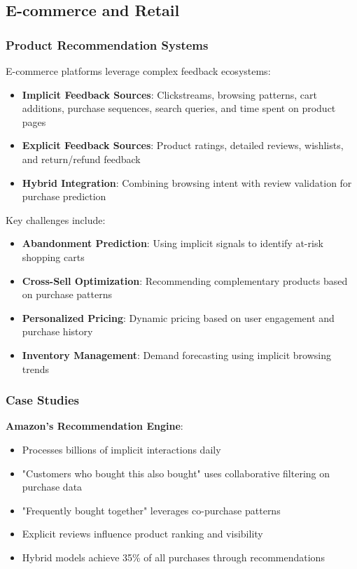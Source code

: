 \documentclass[acmsmall,review,anonymous]{acmart}
\begin{document}
\subsection{E-commerce and Retail}

\subsubsection{Product Recommendation Systems}

E-commerce platforms leverage complex feedback ecosystems:

\begin{itemize}
    \item \textbf{Implicit Feedback Sources}: Clickstreams, browsing patterns, cart additions, purchase sequences, search queries, and time spent on product pages
    \item \textbf{Explicit Feedback Sources}: Product ratings, detailed reviews, wishlists, and return/refund feedback
    \item \textbf{Hybrid Integration}: Combining browsing intent with review validation for purchase prediction
\end{itemize}

Key challenges include:
\begin{itemize}
    \item \textbf{Abandonment Prediction}: Using implicit signals to identify at-risk shopping carts
    \item \textbf{Cross-Sell Optimization}: Recommending complementary products based on purchase patterns
    \item \textbf{Personalized Pricing}: Dynamic pricing based on user engagement and purchase history
    \item \textbf{Inventory Management}: Demand forecasting using implicit browsing trends
\end{itemize}

\subsubsection{Case Studies}

\textbf{Amazon's Recommendation Engine}:
\begin{itemize}
    \item Processes billions of implicit interactions daily
    \item "Customers who bought this also bought" uses collaborative filtering on purchase data
    \item "Frequently bought together" leverages co-purchase patterns
    \item Explicit reviews influence product ranking and visibility
    \item Hybrid models achieve 35\% of all purchases through recommendations
\end{itemize}
\end{document}
